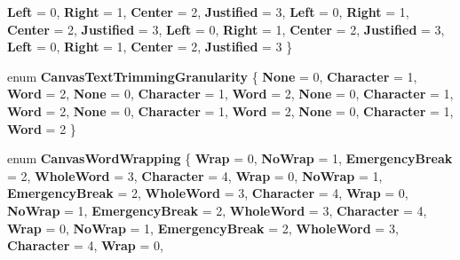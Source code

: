 \begin{DoxyCompactItemize}
{\bfseries Left} = 0, 
{\bfseries Right} = 1, 
{\bfseries Center} = 2, 
{\bfseries Justified} = 3, 
\newline
{\bfseries Left} = 0, 
{\bfseries Right} = 1, 
{\bfseries Center} = 2, 
{\bfseries Justified} = 3, 
\newline
{\bfseries Left} = 0, 
{\bfseries Right} = 1, 
{\bfseries Center} = 2, 
{\bfseries Justified} = 3, 
\newline
{\bfseries Left} = 0, 
{\bfseries Right} = 1, 
{\bfseries Center} = 2, 
{\bfseries Justified} = 3
 \}
\item 
\mbox{\label{namespace_microsoft_1_1_graphics_1_1_canvas_1_1_text_a24d5fc875e6366ffdebd4fc9db910c21}} 
enum {\bfseries Canvas\+Text\+Trimming\+Granularity} \{ \newline
{\bfseries None} = 0, 
{\bfseries Character} = 1, 
{\bfseries Word} = 2, 
{\bfseries None} = 0, 
\newline
{\bfseries Character} = 1, 
{\bfseries Word} = 2, 
{\bfseries None} = 0, 
{\bfseries Character} = 1, 
\newline
{\bfseries Word} = 2, 
{\bfseries None} = 0, 
{\bfseries Character} = 1, 
{\bfseries Word} = 2, 
\newline
{\bfseries None} = 0, 
{\bfseries Character} = 1, 
{\bfseries Word} = 2
 \}
\item 
\mbox{\label{namespace_microsoft_1_1_graphics_1_1_canvas_1_1_text_aad13d6b470583df1dcc8167f6568eb39}} 
enum {\bfseries Canvas\+Word\+Wrapping} \{ \newline
{\bfseries Wrap} = 0, 
{\bfseries No\+Wrap} = 1, 
{\bfseries Emergency\+Break} = 2, 
{\bfseries Whole\+Word} = 3, 
\newline
{\bfseries Character} = 4, 
{\bfseries Wrap} = 0, 
{\bfseries No\+Wrap} = 1, 
{\bfseries Emergency\+Break} = 2, 
\newline
{\bfseries Whole\+Word} = 3, 
{\bfseries Character} = 4, 
{\bfseries Wrap} = 0, 
{\bfseries No\+Wrap} = 1, 
\newline
{\bfseries Emergency\+Break} = 2, 
{\bfseries Whole\+Word} = 3, 
{\bfseries Character} = 4, 
{\bfseries Wrap} = 0, 
\newline
{\bfseries No\+Wrap} = 1, 
{\bfseries Emergency\+Break} = 2, 
{\bfseries Whole\+Word} = 3, 
{\bfseries Character} = 4, 
\newline
{\bfseries Wrap} = 0, 

\end{DoxyCompactItemize}
